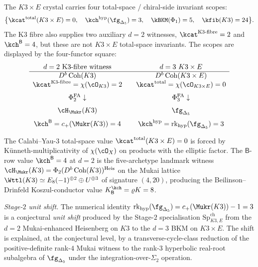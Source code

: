 \begin{theorem}
\label{wn:thm:second-pass-four-functor-square}

The $K3 \times E$ crystal carries four total-space / chiral-side
invariant scopes:
\[
\bigl\{
\kcat^{\mathrm{total}}(K3 \times E)=0,\quad
\kch^{\mathrm{hyp}}(\fg_{\Delta_5})=3,\quad
\kBKM(\Phi_1)=5,\quad
\kfib(K3)=24
\bigr\}.
\]
The K3 fibre also supplies two auxiliary $d=2$ witnesses,
$\kcat^{\mathrm{K3\text{-}fibre}}=2$ and
$\kch^{\mathsf{B}}=4$, but these are not $K3\times E$ total-space
invariants.  The scopes are displayed by the four-functor square:
\[
\begin{array}{c@{\qquad}c}
d = 2\ \text{K3-fibre witness} & d = 3\ K3\times E \\
\hline
D^b\,\mathrm{Coh}(K3) & D^b\,\mathrm{Coh}(K3\times E) \\
\kcat^{\mathrm{K3\text{-}fibre}} = \chi(\cO_{K3}) = 2
 & \kcat^{\mathrm{total}} = \chi(\cO_{K3\times E}) = 0\\[1.5ex]
\Phi^{\mathrm{FA}}_2 \downarrow & \Phi^{\mathrm{FA}}_3 \downarrow \\[1.5ex]
\cH_{\Mukr}(K3) & \fg_{\Delta_5}\\[1.5ex]
\kch^{\mathsf{B}} = c_+(\Mukr(K3)) = 4
 & \kch^{\mathrm{hyp}} = \mathrm{rk}_{\mathrm{hyp}}(\fg_{\Delta_5}) = 3
\end{array}
\]

The Calabi--Yau-$3$ total-space value
$\kcat^{\mathrm{total}}(K3 \times E) = 0$ is forced by
K\"unneth-multiplicativity of $\chi(\cO_X)$ on products with the
elliptic factor.  The $\mathsf{B}$-row value
$\kch^{\mathsf{B}} = 4$ at $d = 2$ is the five-archetype landmark
witness
$\cH_{\Mukr}(K3) = \Phi_2(D^b\,\mathrm{Coh}(K3))^{\mathrm{Heis}}$ on
the Mukai lattice $\Wttl(K3) \simeq E_8(-1)^{\oplus 2} \oplus
U^{\oplus 3}$ of signature $(4, 20)$, producing the Beilinson--Drinfeld
Koszul-conductor value $K^{\kch}_{\mathsf{B}} = \varrho K = 8$.

\emph{Stage-$2$ unit shift.} The numerical identity
$\mathrm{rk}_{\mathrm{hyp}}(\fg_{\Delta_5}) = c_+(\Mukr(K3)) - 1 = 3$
is a conjectural \emph{unit shift} produced by the Stage-$2$
specialisation $\mathrm{Sp}^{\mathrm{ch}}_{K3, E}$ from the $d = 2$
Mukai-enhanced Heisenberg on $K3$ to the $d = 3$ BKM on
$K3 \times E$. The shift is explained, at the conjectural level, by a
transverse-cycle-class reduction of the positive-definite rank-$4$
Mukai witness to the rank-$3$ hyperbolic real-root subalgebra of
$\fg_{\Delta_5}$ under the integration-over-$\Sigma_2$ operation.
\end{theorem}

